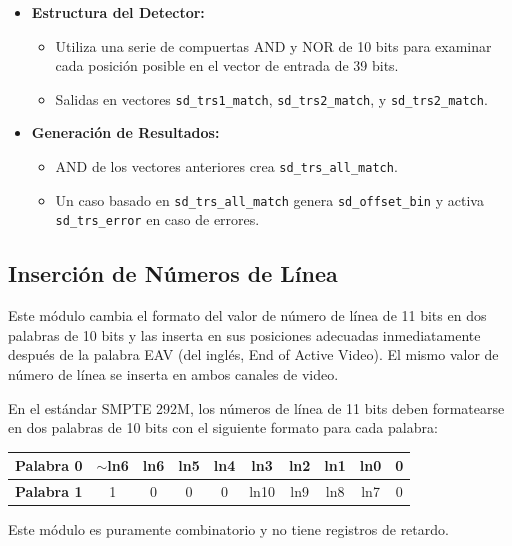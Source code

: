 \begin{itemize}
    \item \textbf{Estructura del Detector:}
    \begin{itemize}
        \item Utiliza una serie de compuertas AND y NOR de 10 bits para examinar cada posición posible en el vector de entrada de 39 bits.
        \item Salidas en vectores \texttt{sd\_trs1\_match}, \texttt{sd\_trs2\_match}, y \texttt{sd\_trs2\_match}.
    \end{itemize}
    
    \item \textbf{Generación de Resultados:}
    \begin{itemize}
        \item AND de los vectores anteriores crea \texttt{sd\_trs\_all\_match}.
        \item Un caso basado en \texttt{sd\_trs\_all\_match} genera \texttt{sd\_offset\_bin} y activa \texttt{sd\_trs\_error} en caso de errores.
    \end{itemize}
\end{itemize}

\subsection{Inserción de Números de Línea}

Este módulo cambia el formato del valor de número de línea de 11 bits en dos
palabras de 10 bits y las inserta en sus posiciones adecuadas inmediatamente
después de la palabra EAV (del inglés, End of Active Video)\@. El mismo valor
de número de línea se inserta en ambos canales de video.

En el estándar SMPTE 292M, los números de línea de 11 bits deben formatearse en
dos palabras de 10 bits con el siguiente formato para cada palabra:

\begin{center}
  \begin{tabular}{|c|c|c|c|c|c|c|c|c|c|}
    \hline
    \textbf{Palabra 0} & $\sim$ln6 & ln6 & ln5 & ln4 & ln3 & ln2 & ln1 & ln0 & 0 \\
    \hline
    \textbf{Palabra 1} & 1 & 0 & 0 & 0 & ln10 & ln9 & ln8 & ln7 & 0 \\
    \hline
  \end{tabular}
\end{center}

Este módulo es puramente combinatorio y no tiene registros de retardo.

